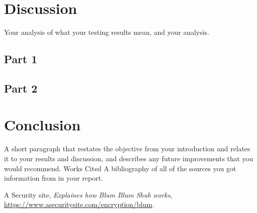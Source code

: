 \documentclass[12pt, letterpaper]{article}
\begin{document}
\section*{Discussion}
Your analysis of what your testing results mean, and your analysis.
\subsection*{Part 1}


\subsection*{Part 2}

\section*{Conclusion}
A short paragraph that restates the objective from your introduction and relates it to your results
and discussion, and describes any future improvements that you would recommend. Works Cited A
bibliography of all of the sources you got information from in your report.

\newpage
\begin{thebibliography}{10} 
 A Security site,  \emph{Explaines how Blum Blum Shub works},
\url{https://www.asecuritysite.com/encryption/blum}.
\end{thebibliography}
\end{document}
